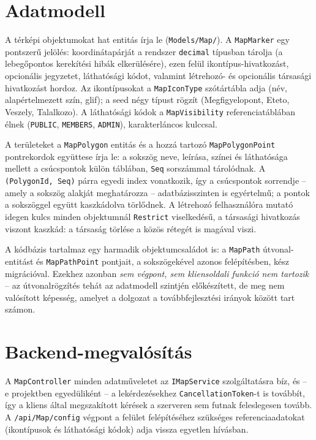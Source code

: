 \section{Adatmodell}
\label{sec:map-adatmodell}

A térképi objektumokat hat entitás írja le (\texttt{Models/Map/}). A \texttt{MapMarker} egy
pontszerű jelölés: koordinátapárját a rendszer \texttt{decimal} típusban tárolja (a lebegőpontos
kerekítési hibák elkerülésére), ezen felül ikontípus-hivatkozást, opcionális jegyzetet,
láthatósági kódot, valamint létrehozó- és opcionális társasági hivatkozást hordoz. Az
ikontípusokat a \texttt{MapIconType} szótártábla adja (név, alapértelmezett szín, glif); a seed
négy típust rögzít (Megfigyelopont, Eteto, Veszely, Talalkozo). A láthatósági kódok a
\texttt{MapVisibility} referenciatáblában élnek (\texttt{PUBLIC}, \texttt{MEMBERS},
\texttt{ADMIN}), karakterláncos kulccsal.

A területeket a \texttt{MapPolygon} entitás és a hozzá tartozó \texttt{MapPolygonPoint}
pontrekordok együttese írja le: a sokszög neve, leírása, színei és láthatósága mellett a
csúcspontok külön táblában, \texttt{Seq} sorszámmal tárolódnak. A
\texttt{(PolygonId, Seq)} párra egyedi index vonatkozik, így a csúcspontok sorrendje -- amely a
sokszög alakját meghatározza -- adatbázisszinten is egyértelmű; a pontok a sokszöggel együtt
kaszkádolva törlődnek. A létrehozó felhasználóra mutató idegen kulcs minden objektumnál
\texttt{Restrict} viselkedésű, a társasági hivatkozás viszont kaszkád: a társaság törlése a közös
rétegét is magával viszi.

A kódbázis tartalmaz egy harmadik objektumcsaládot is: a \texttt{MapPath} útvonal-entitást és
\texttt{MapPathPoint} pontjait, a sokszögekével azonos felépítésben, kész migrációval. Ezekhez
azonban \emph{sem végpont, sem kliensoldali funkció nem tartozik} -- az útvonalrögzítés tehát az
adatmodell szintjén előkészített, de meg nem valósított képesség, amelyet a dolgozat a
továbbfejlesztési irányok között tart számon.

\section{Backend-megvalósítás}
\label{sec:map-backend}

A \texttt{MapController} minden adatműveletet az \texttt{IMapService} szolgáltatásra bíz, és --
e projektben egyedüliként -- a lekérdezésekhez \texttt{CancellationToken}-t is továbbít, így a
kliens által megszakított kérések a szerveren sem futnak feleslegesen tovább. A
\texttt{/api/Map/config} végpont a felület felépítéséhez szükséges referenciaadatokat (ikontípusok
és láthatósági kódok) adja vissza egyetlen hívásban.

